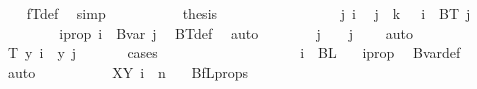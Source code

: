 \begin{isabellebody}
\ {}\ \isamarkupfalse%
\ fT{\isacharunderscore}{\kern0pt}def\ \isamarkupfalse%
\ simp\isanewline
\ \ \ \ \ \ \ \isamarkupfalse%
\ \isamarkupfalse%
\ {\isacharquery}{\kern0pt}thesis\ \isacommand{{\isachardot}{\kern0pt}}\isamarkupfalse%
\isanewline
\ \ \ \ \ \isamarkupfalse%
\isanewline
\ \ \ \isamarkupfalse%
\isanewline
\ \ \ \ \ \isamarkupfalse%
\ j\ i\ \isamarkupfalse%
\ {\isachardoublequoteopen}j\ {\isacharless}{\kern0pt}\ k\ {\isacharplus}{\kern0pt}\ {}{\isachardoublequoteclose}\ {\isachardoublequoteopen}i\ {\isasymin}\ BT\ j{\isachardoublequoteclose}\isanewline
\ \ \ \ \ \isamarkupfalse%
\ \isamarkupfalse%
\ i{\isacharunderscore}{\kern0pt}prop{\isacharcolon}{\kern0pt}\ {\isachardoublequoteopen}i\ {\isasymin}\ Bvar\ j{\isachardoublequoteclose}\ \isamarkupfalse%
\ BT{\isacharunderscore}{\kern0pt}def\ \isamarkupfalse%
\ auto\isanewline
\ \ \ \ \ \ \isamarkupfalse%
\ {\isachardoublequoteopen}j\ {\isacharequal}{\kern0pt}\ {}{\isachardoublequoteclose}\ {\isacharbar}{\kern0pt}\ {\isachardoublequoteopen}j\ {\isachargreater}{\kern0pt}\ {}{\isachardoublequoteclose}\ \isamarkupfalse%
\ auto\isanewline
\ \ \ \ \ \isamarkupfalse%
\ \isamarkupfalse%
\ {\isachardoublequoteopen}T\ y\ i\ {\isacharequal}{\kern0pt}\ y\ j{\isachardoublequoteclose}\isanewline
\ \ \ \ \ \isamarkupfalse%
\ cases\isanewline
\ \ \ \ \ \ \ \isamarkupfalse%
\ {}\isanewline
\ \ \ \ \ \ \ \isamarkupfalse%
\ \isamarkupfalse%
\ {\isachardoublequoteopen}i\ {\isasymin}\ BL\ {}{\isachardoublequoteclose}\ \isamarkupfalse%
\ i{\isacharunderscore}{\kern0pt}prop\ \isamarkupfalse%
\ Bvar{\isacharunderscore}{\kern0pt}def\ \isamarkupfalse%
\ auto\isanewline
\ \ \ \ \ \ \ \isamarkupfalse%
\ \isamarkupfalse%
\ XY{\isacharcolon}{\kern0pt}\ {\isachardoublequoteopen}i\ {\isasymin}\ {\isacharbraceleft}{\kern0pt}{\isachardot}{\kern0pt}{\isachardot}{\kern0pt}{\isacharless}{\kern0pt}n{\isacharbraceright}{\kern0pt}{\isachardoublequoteclose}\ \isamarkupfalse%
\ {}\ BfL{\isacharunderscore}{\kern0pt}props{\isacharparenleft}{\kern0pt}{}{\isacharparenright}{\kern0pt}\ \isamarkupfalse%

\end{isabellebody}
